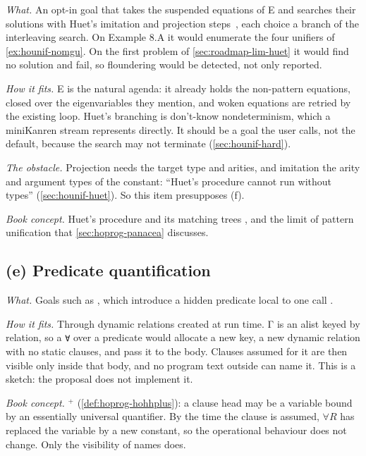 \emph{What.} An opt-in goal that takes the suspended equations of E and searches their solutions with
Huet's imitation and projection steps~\cite{Huet1975}, each choice a branch of the interleaving search.
On Example 8.A it would enumerate the four unifiers of \cref{ex:hounif-nomgu}. On the first problem of
\cref{sec:roadmap-lim-huet} it would find no solution and fail, so floundering would be detected, not
only reported.

\emph{How it fits.} E is the natural agenda: it already holds the non-pattern equations, closed over the
eigenvariables they mention, and woken equations are retried by the existing loop. Huet's branching is
don't-know nondeterminism, which a miniKanren stream represents directly. It should be a goal the user
calls, not the default, because the search may not terminate (\cref{sec:hounif-hard}).

\emph{The obstacle.} Projection needs the target type and arities, and imitation the arity and argument
types of the constant: \enquote{Huet's procedure cannot run without types} (\cref{sec:hounif-huet}).
So this item presupposes (f).

\emph{Book concept.} Huet's procedure and its matching trees , and the limit of
pattern unification that \cref{sec:hoprog-panacea} discusses.

\subsection{(e) Predicate quantification}\label{sec:roadmap-later-pred}

\emph{What.} Goals such as , which introduce a hidden predicate
local to one call .

\emph{How it fits.} Through dynamic relations created at run time. Γ is an alist keyed by relation, so a
\texttt{∀} over a predicate would allocate a new key, a new dynamic relation with no static clauses, and
pass it to the body. Clauses assumed for it are then visible only inside that body, and no program text
outside can name it. This is a sketch: the proposal does not implement it.

\emph{Book concept.} \hohh$^+$ (\cref{def:hoprog-hohhplus}): a clause head may be a variable bound by an
essentially universal quantifier. By the time the clause is assumed, $\forall R$ has replaced the variable
by a new constant, so the operational behaviour does not change. Only the visibility of names does.

